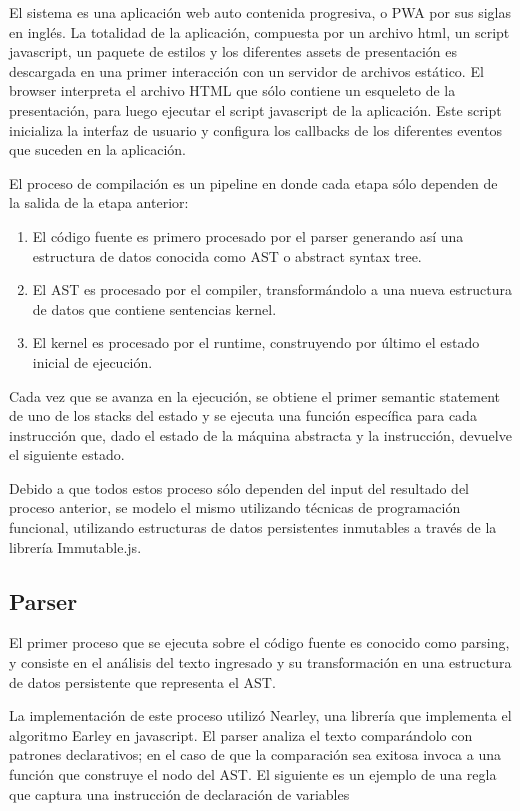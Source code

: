 \documentclass[a4paper,11pt]{article}
\begin{document}
El sistema es una aplicación web auto contenida progresiva, o PWA por sus siglas en inglés. La totalidad de la aplicación, compuesta por un archivo html, un script javascript, un paquete de estilos y los diferentes assets de presentación es descargada en una primer interacción con un servidor de archivos estático. El browser interpreta el archivo HTML que sólo contiene un esqueleto de la presentación, para luego ejecutar el script javascript de la aplicación. Este script inicializa la interfaz de usuario y configura los callbacks de los diferentes eventos que suceden en la aplicación.

El proceso de compilación es un pipeline en donde cada etapa sólo dependen de la salida de la etapa anterior: 

\begin{enumerate}
    \item El código fuente es primero procesado por el parser generando así una estructura de datos conocida como AST\cite{ast} o abstract syntax tree.
    \item El AST es procesado por el compiler, transformándolo a una nueva estructura de datos que contiene sentencias kernel.
    \item El kernel es procesado por el runtime, construyendo por último el estado inicial de ejecución.
\end{enumerate}

Cada vez que se avanza en la ejecución, se obtiene el primer semantic statement de uno de los stacks del estado y se ejecuta una función específica para cada instrucción que, dado el estado de la máquina abstracta y la instrucción, devuelve el siguiente estado.

Debido a que todos estos proceso sólo dependen del input del resultado del proceso anterior, se modelo el mismo utilizando técnicas de programación funcional, utilizando estructuras de datos persistentes inmutables a través de la librería Immutable.js\cite{immutable}.

\subsection{Parser}

El primer proceso que se ejecuta sobre el código fuente es conocido como parsing\cite{parsing}, y consiste en el análisis del texto ingresado y su transformación en una estructura de datos persistente que representa el AST.

La implementación de este proceso utilizó Nearley\cite{nearley}, una librería que implementa el algoritmo Earley\cite{earley} en javascript. El parser analiza el texto comparándolo con patrones declarativos; en el caso de que la comparación sea exitosa invoca a una función que construye el nodo del AST. El siguiente es un ejemplo de una regla que captura una instrucción de declaración de variables
\end{document}

